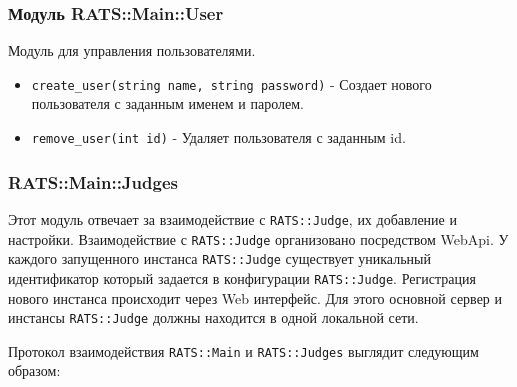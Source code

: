 \documentclass[a4paper,12pt]{article}
\begin{document}
\subsubsection{Модуль RATS::Main::User}
Модуль для управления пользователями. 

\begin{itemize}
    \item \verb+create_user(string name, string password)+ - Создает нового пользователя с заданным именем и паролем.
    \item \verb+remove_user(int id)+ - Удаляет пользователя с заданным id. 
\end{itemize}

\subsubsection{RATS::Main::Judges}
Этот модуль отвечает за взаимодействие с \verb+RATS::Judge+, их добавление и настройки. Взаимодействие с \verb+RATS::Judge+ организовано посредством WebApi. У каждого запущенного инстанса \verb+RATS::Judge+ существует уникальный идентификатор который задается в конфигурации \verb+RATS::Judge+. Регистрация нового инстанса происходит через Web интерфейс. Для этого основной сервер и инстансы \verb+RATS::Judge+ должны находится в одной локальной сети.

Протокол взаимодействия \verb+RATS::Main+ и \verb+RATS::Judges+ выглядит следующим образом:
\end{document}
